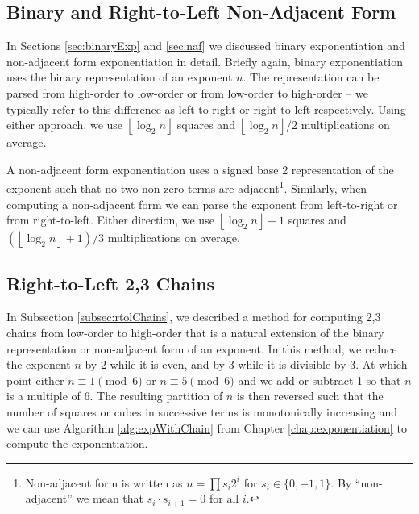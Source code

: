 \documentclass{ucalgthes1}
\theoremstyle{definition}
\newcommand{\floor}[1]{\left\lfloor #1 \right\rfloor}
\begin{document}
\subsection{Binary and Right-to-Left Non-Adjacent Form}

In Sections \ref{sec:binaryExp} and \ref{sec:naf} we discussed binary exponentiation and non-adjacent form exponentiation in detail.  Briefly again, binary exponentiation uses the binary representation of an exponent $n$.  The representation can be parsed from high-order to low-order or from low-order to high-order -- we typically refer to this difference as left-to-right or right-to-left respectively.  Using either approach, we use $\floor{\log_2n}$ squares and $\floor{\log_2n}/2$ multiplications on average.

A non-adjacent form exponentiation uses a signed base 2 representation of the exponent such that no two non-zero terms are adjacent\footnote{Non-adjacent form is written as $n=\prod s_i2^i$ for $s_i \in \{0, -1, 1\}$. By ``non-adjacent'' we mean that $s_i \cdot s_{i+1} = 0$ for all $i$.}.  Similarly, when computing a non-adjacent form we can parse the exponent from left-to-right or from right-to-left.  Either direction, we use $\floor{\log_2n} + 1$ squares and $(\floor{\log_2n}+1)/3$ multiplications on average.   

\subsection{Right-to-Left 2,3 Chains}
In Subsection \ref{subsec:rtolChains}, we described a method for computing 2,3 chains from low-order to high-order that is a natural extension of the binary representation or non-adjacent form of an exponent.  In this method, we reduce the exponent $n$ by 2 while it is even, and by 3 while it is divisible by 3.  At which point either $n \equiv 1 \pmod 6$ or $n \equiv 5 \pmod 6$ and we add or subtract 1 so that $n$ is a multiple of 6.  The resulting partition of $n$ is then reversed such that the number of squares or cubes in successive terms is monotonically increasing and we can use Algorithm \ref{alg:expWithChain} from Chapter \ref{chap:exponentiation} to compute the exponentiation.
\end{document}
